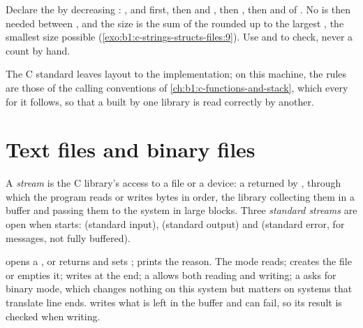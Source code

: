 \begin{method}\label{met:b1:c-strings-structs-files:order}
Declare the  by decreasing : ,  and  first, then  and
, then , then  and  of . No  is then needed between ,
and the size is the sum of the  rounded up to the largest , the smallest size possible
(\cref{exo:b1:c-strings-structs-files:9}). Use  and  to check, never a count by hand.
\end{method}

The C standard leaves layout to the implementation; on this machine, the rules are those of the calling conventions
of \cref{ch:b1:c-functions-and-stack}, which every  for it follows, so that a  built by one
library is read correctly by another.

\section{Text files and binary files}\label{sec:b1:c-strings-structs-files:files}

\begin{definition}\label{def:b1:c-strings-structs-files:stream}
A \emph{stream} is the C library's access to a file or a device: a  returned by
, through which the program reads or writes bytes in order, the library collecting them in a buffer and
passing them to the system in large blocks. Three \emph{standard streams} are open when
 starts:  (standard input),  (standard output) and  (standard error,
for messages, not fully buffered).
\end{definition}

 opens a , or returns  and sets ;  prints the
reason. The mode  reads;  creates the file or empties it;  writes at the end; a
 allows both reading and writing; a  asks for binary mode, which changes nothing on this system but
matters on systems that translate line ends.  writes what is left in the buffer and can fail, so its
result is checked when writing.

